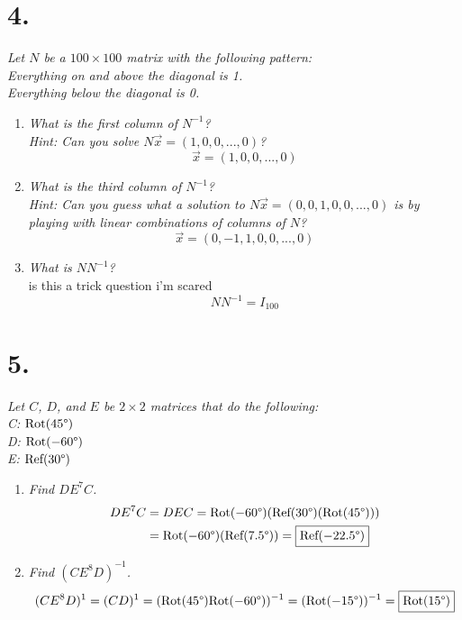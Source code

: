 \documentclass[12pt]{article}
\newcommand{\rota}[1]{\text{Rot}(#1 \degree)}
\newcommand{\refl}[1]{\text{Ref}(#1 \degree)}
\begin{document}
\section*{4.}
\textit{Let $N$ be a $100 \times 100$ matrix with the following pattern: \\
\indent Everything on and above the diagonal is 1. \\
\indent Everything below the diagonal is 0.}
\begin{enumerate}[label=(\alph*)]
	\item \textit{What is the first column of $N^{-1}$? \\
	Hint: Can you solve $N\vec{x} = (1, 0, 0, ..., 0)$?}
	\begin{equation*}
		\boxed{\vec{x} = (1, 0, 0, ..., 0)}
	\end{equation*}
	
	\item \textit{What is the third column of $N^{-1}$? \\
	Hint: Can you guess what a solution to
	$N\vec{x} = (0, 0, 1, 0, 0, ..., 0)$ is by playing with linear
	combinations of columns of $N$?}
	\begin{equation*}
		\boxed{\vec{x} = (0, -1, 1, 0, 0, ..., 0)}
	\end{equation*}
	
	\item \textit{What is $N N^{-1}$?} \\[\baselineskip]
	is this a trick question i'm scared
	\begin{equation*}
		\boxed{N N^{-1} = I_{100}}
	\end{equation*}
\end{enumerate}

\section*{5.}
\textit{Let $C$, $D$, and $E$ be $2 \times 2$ matrices that do the
following: \\
\indent C: $\rota{45}$ \\
\indent D: $\rota{-60}$ \\
\indent E: $\refl{30}$}
\begin{enumerate}[label=(\alph*)]
	\item \textit{Find $DE^7C$.}
	\begin{align*}
		DE^7C &= DEC = \rota{-60} (\refl{30} (\rota{45})) \\
		&= \rota{-60} (\refl{7.5}) = \boxed{\refl{-22.5}}
	\end{align*}
	
	\item \textit{Find $(CE^8D)^{-1}$.}
	\begin{equation*}
		(CE^8D)^{1} = (CD)^{1} =
		(\rota{45} \rota{-60})^{-1} =
		(\rota{-15})^{-1} =
		\boxed{\rota{15}}
	\end{equation*}
\end{enumerate}
\end{document}
